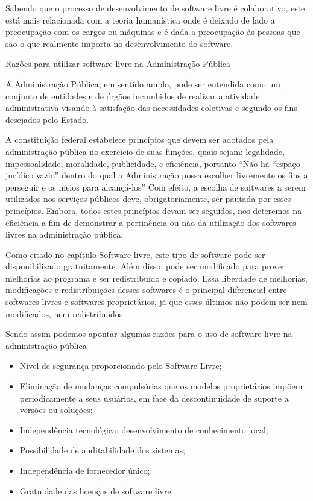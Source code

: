 Sabendo que o processo de desenvolvimento de software livre é colaborativo, este 
está mais relacionada com a teoria humanística onde é deixado de lado a preocupação
com os cargos ou máquinas e é dada a preocupação às pessoas que são o que realmente
importa no desenvolvimento do software.

{Razões para utilizar software livre na Administração Pública}

A Administração Pública, em sentido amplo, pode ser entendida como um conjunto 
de entidades e de órgãos incumbidos de realizar a atividade administrativa visando 
à satisfação das necessidades coletivas e segundo os fins desejados pelo Estado.
\cite{coutinho2012uso}

A constituição federal estabelece princípios que devem ser adotados pela administração pública
no exercício de suas funções, quais sejam: legalidade, impessoalidade, moralidade, publicidade, e
eficiência, portanto “Não há “espaço jurídico vazio” dentro do qual a Administração possa escolher
livremente os fins a perseguir e os meios para alcançá-los” 
%
Com efeito, a escolha de softwares a serem utilizados nos serviços públicos deve, obrigatoriamente,
ser pautada por esses princípios. Embora, todos estes princípios devam ser seguidos, nos
deteremos na eficiência a fim de demonstrar a pertinência ou não da utilização dos softwares livres
na administração pública.\cite{coutinho2012uso}

Como citado no capítulo Software livre, este tipo de software pode ser disponibilizado
gratuitamente. Além disso, pode ser modificado para prover melhorias ao
programa e ser redistribuído e copiado. Essa liberdade de melhorias, modificações e redistribuições
desses softwares é o principal diferencial entre softwares livres e softwares proprietários, já que
esses últimos não podem ser nem modificados, nem redistribuídos.

Sendo assim podemos apontar algumas razões para o uso de software livre na administração 
pública

\begin{itemize}

\item Nível de segurança proporcionado pelo Software Livre;
\item Eliminação de mudanças compulsórias que os modelos proprietários impõem
periodicamente a seus usuários, em face da descontinuidade de suporte a
versões ou soluções; 
\item Independência tecnológica; desenvolvimento de
conhecimento local; 
\item Possibilidade de auditabilidade dos sistemas;
\item Independência de fornecedor único;
\item Gratuidade das licenças de software livre.
\end{itemize}

